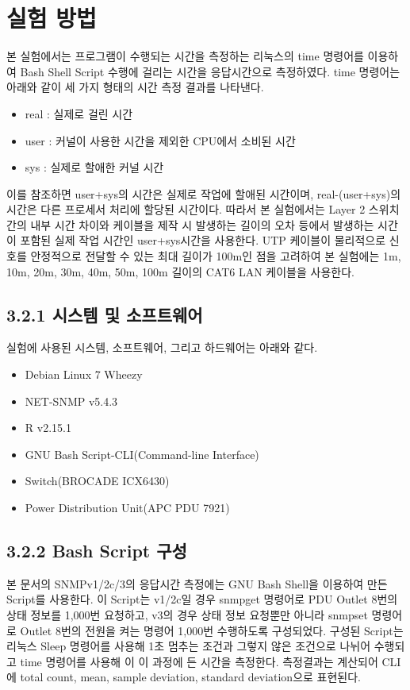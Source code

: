 \documentclass[11pt
  , a4paper
  , article
  , oneside
]{memoir}
\begin{document}
\section{실험 방법}
본 실험에서는 프로그램이 수행되는 시간을 측정하는 리눅스의 time 명령어를 이용하여 Bash Shell Script 수행에 걸리는 시간을 응답시간으로 측정하였다. time 명령어는 아래와 같이 세 가지 형태의 시간 측정 결과를 나타낸다\citep{time_command}. 
\begin{itemize}
\item real : 실제로 걸린 시간
\item user : 커널이 사용한 시간을 제외한 CPU에서 소비된 시간
\item sys : 실제로 할애한 커널 시간
\end{itemize}
이를 참조하면 user+sys의 시간은 실제로 작업에 할애된 시간이며, real-(user+sys)의 시간은 다른 프로세서 처리에 할당된 시간이다. 따라서 본 실험에서는 Layer 2 스위치 간의 내부 시간 차이와 케이블을 제작 시 발생하는 길이의 오차 등에서 발생하는 시간이 포함된 실제 작업 시간인 user+sys시간을 사용한다. UTP 케이블이 물리적으로 신호를 안정적으로 전달할 수 있는 최대 길이가 100m인 점을 고려하여 본 실험에는 1m, 10m, 20m, 30m, 40m, 50m, 100m 길이의 CAT6 LAN 케이블을 사용한다. 

\subsection{3.2.1 시스템 및 소프트웨어}
실험에 사용된 시스템, 소프트웨어, 그리고 하드웨어는 아래와 같다.

\begin{itemize}
\item Debian Linux 7 Wheezy
\item NET-SNMP v5.4.3
\item R v2.15.1
\item GNU Bash Script-CLI(Command-line Interface) 
\item Switch(BROCADE ICX6430)
\item Power Distribution Unit(APC PDU 7921)
\end{itemize}

\subsection{3.2.2 Bash Script 구성}
본 문서의 SNMPv1/2c/3의 응답시간 측정에는 GNU Bash Shell을 이용하여 만든 Script를 사용한다. 이 Script는 v1/2c일 경우 snmpget 명령어로 PDU Outlet 8번의 상태 정보를 1,000번 요청하고, v3의 경우 상태 정보 요청뿐만 아니라 snmpset 명령어로 Outlet 8번의 전원을 켜는 명령어 1,000번 수행하도록 구성되었다. 구성된 Script는 리눅스 Sleep 명령어를 사용해 1초 멈추는 조건과 그렇지 않은 조건으로 나뉘어 수행되고 time 명령어를 사용해 이 이 과정에 든 시간을 측정한다. 측정결과는 계산되어 CLI에 total count, mean, sample deviation, standard deviation으로 표현된다.
\end{document}

